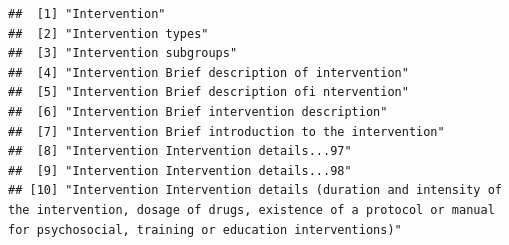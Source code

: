 \documentclass[
]{article}
\begin{document}
\begin{verbatim}
##  [1] "Intervention"                                                                                                                                                                                                                                                   
##  [2] "Intervention types"                                                                                                                                                                                                                                             
##  [3] "Intervention subgroups"                                                                                                                                                                                                                                         
##  [4] "Intervention Brief description of intervention"                                                                                                                                                                                                                 
##  [5] "Intervention Brief description ofi ntervention"                                                                                                                                                                                                                 
##  [6] "Intervention Brief intervention description"                                                                                                                                                                                                                    
##  [7] "Intervention Brief introduction to the intervention"                                                                                                                                                                                                            
##  [8] "Intervention Intervention details...97"                                                                                                                                                                                                                         
##  [9] "Intervention Intervention details...98"                                                                                                                                                                                                                         
## [10] "Intervention Intervention details (duration and intensity of the intervention, dosage of drugs, existence of a protocol or manual for psychosocial, training or education interventions)"                                                                       

\end{verbatim}
\end{document}
